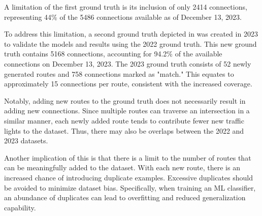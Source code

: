 A limitation of the first ground truth is its inclusion of only 2414 connections, representing 44\% of the 5486 connections available as of December 13, 2023.

To address this limitation, a second ground truth depicted in  was created in 2023 to validate the models and results using the 2022 ground truth. This new ground truth contains 5168 connections, accounting for 94.2\% of the available connections on December 13, 2023. The 2023 ground truth consists of 52 newly generated routes and 758 connections marked as "match." This equates to approximately 15 connections per route, consistent with the increased coverage.

Notably, adding new routes to the ground truth does not necessarily result in adding new connections. Since multiple routes can traverse an intersection in a similar manner, each newly added route tends to contribute fewer new traffic lights to the dataset. Thus, there may also be overlaps between the 2022 and 2023 datasets.

Another implication of this is that there is a limit to the number of routes that can be meaningfully added to the dataset. With each new route, there is an increased chance of introducing duplicate examples. Excessive duplicates should be avoided to minimize dataset bias. Specifically, when training an ML classifier, an abundance of duplicates can lead to overfitting and reduced generalization capability.

